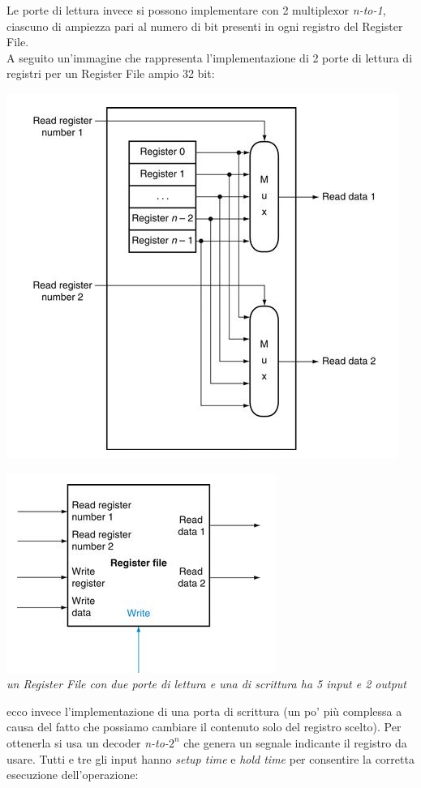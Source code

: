 \documentclass[a4paper,12pt, oneside]{book}
\begin{document}
\begin{itemize}
\begin{enumerate}
\end{enumerate}
Le porte di lettura invece si possono implementare con 2 multiplexor \textit{n-to-1}, ciascuno di ampiezza pari al numero di bit presenti in ogni registro del Register File. 
\\A seguito un'immagine che rappresenta l'implementazione di 2 porte di lettura di registri per un Register File ampio 32 bit:
\begin{center}
\includegraphics[scale=0.7]{img/reg2.png}
\end{center}
\newpage
\begin{center}
\includegraphics[scale=0.7]{img/reg1.png}\\
\textit{un Register File con due porte di lettura e una di scrittura ha 5 input e 2 output }
\end{center}
ecco invece l'implementazione di una porta di scrittura (un po' più complessa a causa del fatto che possiamo cambiare il contenuto solo del registro scelto). Per ottenerla si usa un decoder \textit{n-to-}$2^n$ che genera un segnale indicante il registro da usare. Tutti e tre gli input hanno \textit{setup time} e \textit{hold time} per consentire la corretta esecuzione dell'operazione:

\end{itemize}
\end{document}
